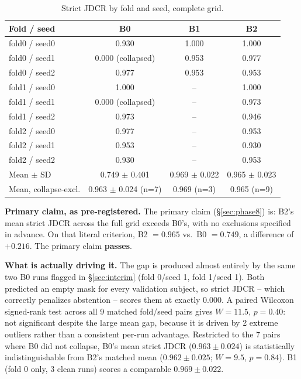 \documentclass[conference]{IEEEtran}
\begin{document}
\begin{table}[t]
\centering
\caption{Strict JDCR by fold and seed, complete grid.}
\label{tab:jdcr}
\begin{tabular}{lccc}
\toprule
\textbf{Fold / seed} & \textbf{B0} & \textbf{B1} & \textbf{B2} \\
\midrule
fold0 / seed0 & 0.930 & 1.000 & 1.000 \\
fold0 / seed1 & 0.000 (collapsed) & 0.953 & 0.977 \\
fold0 / seed2 & 0.977 & 0.953 & 0.953 \\
fold1 / seed0 & 1.000 & -- & 1.000 \\
fold1 / seed1 & 0.000 (collapsed) & -- & 0.973 \\
fold1 / seed2 & 0.973 & -- & 0.946 \\
fold2 / seed0 & 0.977 & -- & 0.953 \\
fold2 / seed1 & 0.953 & -- & 0.930 \\
fold2 / seed2 & 0.930 & -- & 0.953 \\
\midrule
Mean $\pm$ SD & 0.749 $\pm$ 0.401 & 0.969 $\pm$ 0.022 & 0.965 $\pm$ 0.023 \\
Mean, collapse-excl. & 0.963 $\pm$ 0.024 (n=7) & 0.969 (n=3) & 0.965 (n=9) \\
\bottomrule
\end{tabular}
\end{table}

\textbf{Primary claim, as pre-registered.} The primary claim (\S\ref{sec:phase8}) is: B2's mean strict JDCR across the full grid exceeds B0's, with no exclusions specified in advance. On that literal criterion, B2 $=0.965$ vs.\ B0 $=0.749$, a difference of $+0.216$. The primary claim \textbf{passes}.

\textbf{What is actually driving it.} The gap is produced almost entirely by the same two B0 runs flagged in \S\ref{sec:interim} (fold 0/seed 1, fold 1/seed 1). Both predicted an empty mask for every validation subject, so strict JDCR -- which correctly penalizes abstention -- scores them at exactly 0.000. A paired Wilcoxon signed-rank test across all 9 matched fold/seed pairs gives $W=11.5$, $p=0.40$: not significant despite the large mean gap, because it is driven by 2 extreme outliers rather than a consistent per-run advantage. Restricted to the 7 pairs where B0 did not collapse, B0's mean strict JDCR ($0.963 \pm 0.024$) is statistically indistinguishable from B2's matched mean ($0.962 \pm 0.025$; $W=9.5$, $p=0.84$). B1 (fold 0 only, 3 clean runs) scores a comparable $0.969 \pm 0.022$.
\end{document}
